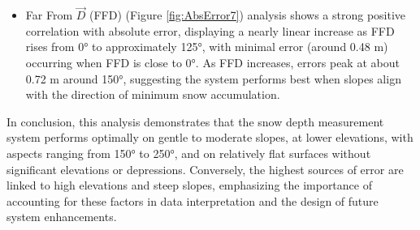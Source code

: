 \documentclass[preprint,12pt]{elsarticle}
\begin{document}
{\begin{itemize}
     \item Far From $\Vec{D}$ (FFD) (Figure \ref{fig:AbsError7}) analysis shows a strong positive correlation with absolute error, displaying a nearly linear increase as FFD rises from 0° to approximately 125°, with minimal error (around 0.48 m) occurring when FFD is close to 0°. As FFD increases, errors peak at about 0.72 m around 150°, suggesting the system performs best when slopes align with the direction of minimum snow accumulation. %
\end{itemize}



In conclusion, this analysis demonstrates that the snow depth measurement system performs optimally on gentle to moderate slopes, at lower elevations, with aspects ranging from 150° to 250°, and on relatively flat surfaces without significant elevations or depressions. Conversely, the highest sources of error are linked to high elevations and steep slopes, emphasizing the importance of accounting for these factors in data interpretation and the design of future system enhancements.

}
\end{document}
